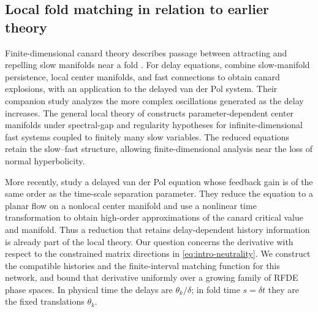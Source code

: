 \subsection{Local fold matching in relation to earlier theory}

Finite-dimensional canard theory describes passage between attracting and
repelling slow manifolds near a fold
\citep{krupa2001relaxation,krupa2001extending}.  For delay equations,
\citet{krupa2016explosion} combine slow-manifold persistence, local center
manifolds, and fast connections to obtain canard explosions, with an
application to the delayed van der Pol system.  Their companion study
\citep{krupa2016complex} analyzes the more complex oscillations generated as
the delay increases.  The general local theory of
\citet[Theorem~4.5 and Corollary~4.6]{avitabile2020local} constructs
parameter-dependent center manifolds under spectral-gap and regularity
hypotheses for infinite-dimensional fast systems coupled to finitely many
slow variables.  The reduced equations retain the slow--fast structure,
allowing finite-dimensional analysis near the loss of normal hyperbolicity.

More recently, \citet{zhang2026high} study a delayed van der Pol equation
whose feedback gain is of the same order as the time-scale separation
parameter.  They reduce the equation to a planar flow on a nonlocal center
manifold and use a nonlinear time transformation to obtain high-order
approximations of the canard critical value and manifold.  Thus a reduction
that retains delay-dependent history information is already part of the
local theory.  Our question concerns the derivative with respect to the
constrained matrix directions in \eqref{eq:intro-neutrality}.  We construct
the compatible histories and the finite-interval matching function for this
network, and bound that derivative uniformly over a growing family of RFDE
phase spaces.  In physical time the delays are \(\theta_k/\delta\); in fold
time \(s=\delta t\) they are the fixed translations \(\theta_k\).

